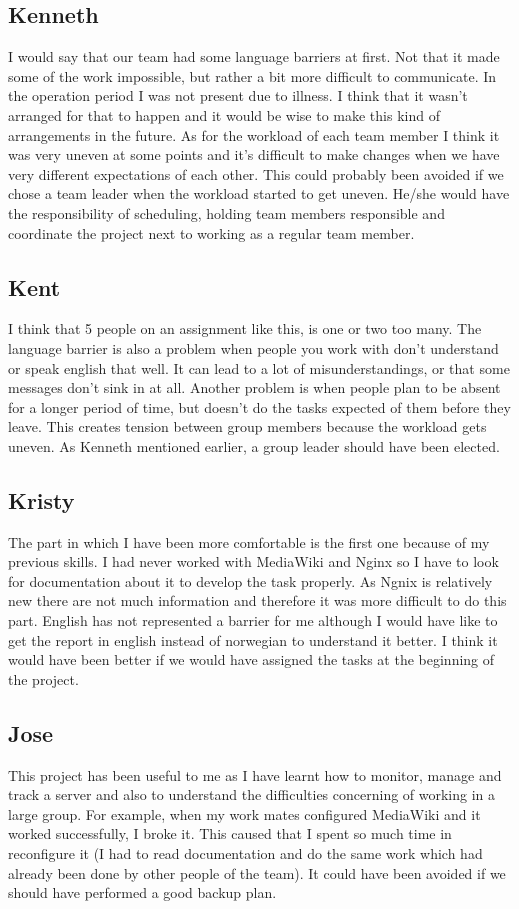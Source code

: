 \subsection{Kenneth}
I would say that our team had some language barriers at first. Not that it made some of the work impossible, but rather a bit more difficult to communicate. In the operation period I was not present due to illness. I think that it wasn’t arranged for that to happen and it would be wise to make this kind of arrangements in the future. As for the workload of each team member I think it was very uneven at some points and it’s difficult to make changes when we have very different expectations of each other. This could probably been avoided if we chose a team leader when the workload started to get uneven. He/she would have the responsibility of scheduling, holding team members responsible and coordinate the project next to working as a regular team member.
\subsection{Kent}
I think that 5 people on an assignment like this, is one or two too many. The language barrier is also a problem when people you work with don’t understand or speak english that well. It can lead to a lot of misunderstandings, or that some messages don’t sink in at all. Another problem is when people plan to be absent for a longer period of time, but doesn’t do the tasks expected of them before they leave. This creates tension between group members because the workload gets uneven. As Kenneth mentioned earlier, a group leader should have been elected.
\subsection{Kristy}
The part in which I have been more comfortable is the first one because of my previous skills. 
I had never worked with MediaWiki and Nginx so I have to look for documentation about it to develop the task properly. As Ngnix is relatively new there are not much information and therefore it was more difficult to do this part. 
English has not represented a barrier for me although I would have like to get the report in english instead of norwegian to understand it better.
I think it would have been better if we would have assigned the tasks at the beginning of the project.
\subsection{Jose}
This project has been useful to me as I have learnt how to monitor, manage and track a server and also to understand the difficulties concerning of working in a large group. For example, when my work mates configured MediaWiki and it worked successfully, I broke it. This caused that I spent so much time in reconfigure it (I had to read documentation and do the same work which had already been done by other people of the team). It could have been avoided if we should have performed a good backup plan.  
\pagebreak